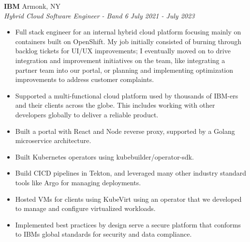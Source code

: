 \documentclass[letterpaper,11pt]{article}
\newcommand{\resumeItem}[2]{
    \item\small{
        \textbf{#1}{#2 \vspace{-2pt}}
    }
}
\newcommand{\resumeSubheading}[4]{
    \vspace{-1pt}
        \item \textbf{#1} \hfill #2 \\
        \textit{\small#3} \hfill \textit{\small #4} \\
    \vspace{-8pt}
}
\newcommand{\resumeItemListStart}{\begin{itemize}}
\newcommand{\resumeItemListEnd}{\end{itemize}\vspace{0pt}}
\begin{document}
    \vspace{-1.00mm}

    \resumeSubheading
        {IBM}{Armonk, NY}
        {Hybrid Cloud Software Engineer - Band 6}{July 2021 - July 2023}
        \resumeItemListStart
            \resumeItem{}
                {Full stack engineer for an internal hybrid cloud platform focusing mainly on containers built on OpenShift.
                My job initially consisted of burning through backlog tickets for UI/UX improvements;
                I eventually moved on to drive integration and improvement initiatives on the team, like 
                integrating a partner team into our portal, or planning and implementing optimization
                improvements to address customer complaints.}
            \resumeItem{}
                {Supported a multi-functional cloud platform used by thousands of IBM-ers and their clients across the globe. This includes working with other developers globally to deliver a reliable product.}
            \resumeItem{}
                {Built a portal with React and Node reverse proxy, supported by a Golang microservice architecture.}
            \resumeItem{}
                {Built Kubernetes operators using kubebuilder/operator-sdk.}
            \resumeItem{}
                {Build CICD pipelines in Tekton, and leveraged many other industry standard tools like Argo for managing deployments.}
            \resumeItem{}
                {Hosted VMs for clients using KubeVirt using an operator that we developed to manage and configure virtualized workloads.}
            \resumeItem{}
                {Implemented best practices by design serve a secure platform that conforms to IBMs global standards for security and data compliance.}
        \resumeItemListEnd

    \vspace{-1.00mm}
\end{document}
